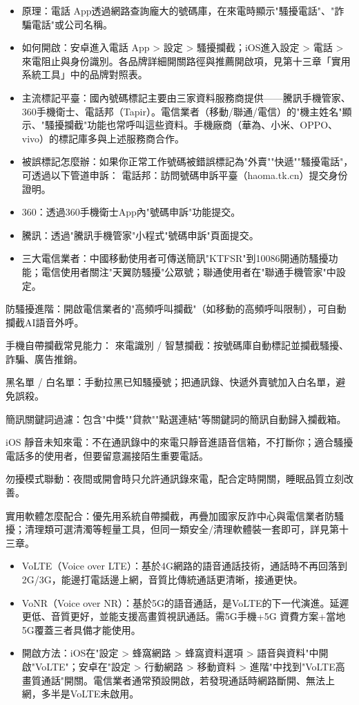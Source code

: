 \begin{itemize}
  \item 原理：電話 App透過網路查詢龐大的號碼庫，在來電時顯示"騷擾電話"、"詐騙電話"或公司名稱。
  \item 如何開啟：安卓進入電話 App > 設定 > 騷擾攔截；iOS進入設定 > 電話 > 來電阻止與身份識別。各品牌詳細開關路徑與推薦開啟項，見第十三章「實用系統工具」中的品牌對照表。
  \item 主流標記平臺：國內號碼標記主要由三家資料服務商提供——騰訊手機管家、360手機衛士、電話邦（Tapir）。電信業者（移動/聯通/電信）的"機主姓名"顯示、"騷擾攔截"功能也常呼叫這些資料。手機廠商（華為、小米、OPPO、vivo）的標記庫多與上述服務商合作。
  \item 被誤標記怎麼辦：如果你正常工作號碼被錯誤標記為"外賣""快遞""騷擾電話"，可透過以下管道申訴： 電話邦：訪問號碼申訴平臺（haoma.tk.cn）提交身份證明。
  \item 360：透過360手機衛士App內"號碼申訴"功能提交。
  \item 騰訊：透過"騰訊手機管家"小程式"號碼申訴"頁面提交。
  \item 三大電信業者：中國移動使用者可傳送簡訊"KTFSR"到10086開通防騷擾功能；電信使用者關注"天翼防騷擾"公眾號；聯通使用者在"聯通手機管家"中設定。
\end{itemize}

防騷擾進階：開啟電信業者的"高頻呼叫攔截"（如移動的高頻呼叫限制），可自動攔截AI語音外呼。

手機自帶攔截常見能力： 來電識別 / 智慧攔截：按號碼庫自動標記並攔截騷擾、詐騙、廣告推銷。

黑名單 / 白名單：手動拉黑已知騷擾號；把通訊錄、快遞外賣號加入白名單，避免誤殺。

簡訊關鍵詞過濾：包含"中獎""貸款""點選連結"等關鍵詞的簡訊自動歸入攔截箱。

iOS 靜音未知來電：不在通訊錄中的來電只靜音進語音信箱，不打斷你；適合騷擾電話多的使用者，但要留意漏接陌生重要電話。

勿擾模式聯動：夜間或開會時只允許通訊錄來電，配合定時開關，睡眠品質立刻改善。

實用軟體怎麼配合：優先用系統自帶攔截，再疊加國家反詐中心與電信業者防騷擾；清理類可選清濁等輕量工具，但同一類安全/清理軟體裝一套即可，詳見第十三章。


\begin{itemize}
  \item VoLTE（Voice over LTE）：基於4G網路的語音通話技術，通話時不再回落到2G/3G，能邊打電話邊上網，音質比傳統通話更清晰，接通更快。
  \item VoNR（Voice over NR）：基於5G的語音通話，是VoLTE的下一代演進。延遲更低、音質更好，並能支援高畫質視訊通話。需5G手機+5G 資費方案+當地5G覆蓋三者具備才能使用。
  \item 開啟方法：iOS在"設定 > 蜂窩網路 > 蜂窩資料選項 > 語音與資料"中開啟"VoLTE"；安卓在"設定 > 行動網路 > 移動資料 > 進階"中找到"VoLTE高畫質通話"開關。電信業者通常預設開啟，若發現通話時網路斷開、無法上網，多半是VoLTE未啟用。
\end{itemize}


